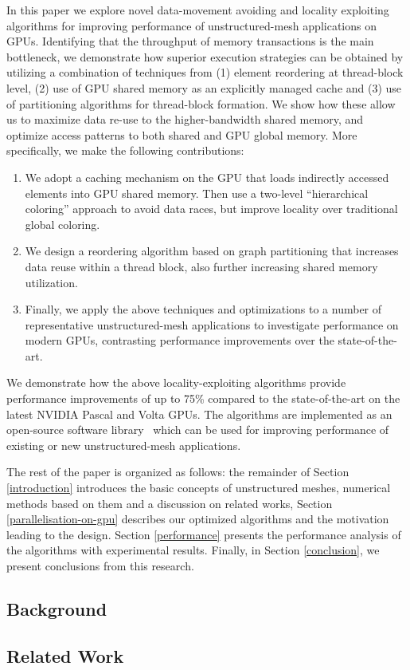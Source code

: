 In this paper we explore novel data-movement avoiding and locality exploiting 
algorithms for improving performance of unstructured-mesh applications on GPUs. 
Identifying that the throughput of memory transactions is the main bottleneck, 
we demonstrate how superior execution strategies can be obtained by utilizing 
a combination of techniques from (1) element reordering at thread-block level, 
(2) use of GPU shared memory as an explicitly managed cache and (3) use of 
partitioning algorithms for thread-block formation. We show how these allow us 
to maximize data re-use to the higher-bandwidth shared memory, and optimize 
access patterns to both shared and GPU global memory. More specifically, we make 
the following contributions:
\begin{enumerate}
\item We adopt a caching mechanism on the GPU that loads indirectly accessed 
elements into GPU shared memory. Then use a two-level ``hierarchical coloring'' 
approach to avoid data races, but improve locality over traditional global 
coloring. 

\item We design a reordering algorithm based on graph partitioning that 
increases data reuse within a thread block, also further increasing shared 
memory utilization. 

\item Finally, we apply the above techniques and optimizations to a number of 
representative unstructured-mesh applications to investigate performance on 
modern GPUs, contrasting performance improvements over the state-of-the-art. 
\end{enumerate}

\noindent We demonstrate how the above locality-exploiting algorithms provide 
performance improvements of up to 75\% compared to the state-of-the-art on the 
latest NVIDIA Pascal and Volta GPUs. The algorithms are implemented as an 
open-source software library~\cite{opt-library} which can be used for improving 
performance of existing or new unstructured-mesh applications. 

The rest of the paper is organized as follows: the remainder of Section
\ref{introduction} introduces the basic concepts of unstructured meshes, 
numerical methods based on them and a discussion on related works, Section 
\ref{parallelisation-on-gpu} describes our optimized algorithms and the 
motivation leading to the design. Section \ref{performance} presents the 
performance analysis of the algorithms with experimental results. Finally, in 
Section \ref{conclusion}, we present conclusions from this research. 


\subsection{Background}\label{sec:background}


\subsection{Related Work}\label{sec:related-works}



